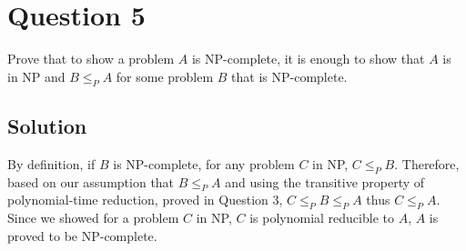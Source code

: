
\section*{Question 5}

Prove that to show a problem $A$ is NP-complete, it is enough to show that $A$ is in NP and $B \leq_P A$ for some problem $B$ that is NP-complete.

\subsection*{Solution}

By definition, if $B$ is NP-complete, for any problem $C$ in NP, $C \leq_P B$. Therefore, based on our assumption that $B \leq_P A$ and using the transitive property of polynomial-time reduction, proved in Question 3, $C \leq_P B \leq_P A$ thus $C \leq_P A$. Since we showed for a problem $C$ in NP, $C$ is polynomial reducible to $A$, $A$ is proved to be NP-complete.
